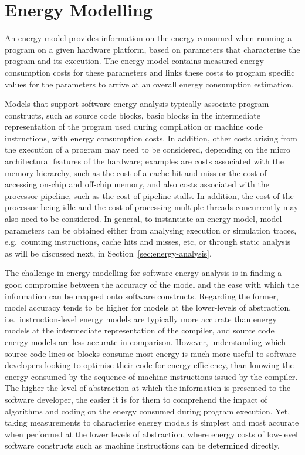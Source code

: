 \nopagebreak
\section{Energy Modelling}\label{sec:energy-models}

An energy model provides information on the energy consumed when running a program on a given hardware platform, based on parameters that characterise the program and its execution. The energy model contains measured energy consumption costs for these parameters and links these costs to program specific values for the parameters to arrive at an overall energy consumption estimation. 

Models that support software energy analysis typically associate program constructs, such as source code blocks, basic blocks in the intermediate representation of the program used during compilation or machine code instructions, with energy consumption costs. In addition, other costs arising from the execution of a program may need to be considered, depending on the micro architectural features of the hardware; examples are costs associated with the memory hierarchy, such as the cost of a cache hit and miss or the cost of accessing on-chip and off-chip memory, and also costs associated with the processor pipeline, such as the cost of pipeline stalls. In addition, the cost of the processor being idle and the cost of processing multiple threads concurrently may also need to be considered. 
%
In general, to instantiate an energy model, model parameters can be obtained either from analysing execution or simulation traces, e.g.\ counting instructions, cache hits and misses, etc, or through static analysis as will be discussed next, in Section~\ref{sec:energy-analysis}.

The challenge in energy modelling for software energy analysis is in finding a good compromise between the accuracy of the model and the ease with which the information can be mapped onto software constructs. Regarding the former, model accuracy tends to be higher for models at the lower-levels of abstraction, i.e.\ instruction-level energy models are typically more accurate than energy models at the intermediate representation of the compiler, and source code energy models are less accurate in comparison. 
%
However, understanding which source code lines or blocks consume most energy is much more useful to software developers looking to optimise their code for energy efficiency, than knowing the energy consumed by the sequence of machine instructions issued by the compiler. The higher the level of abstraction at which the information is presented to the software developer, the easier it is for them to comprehend the impact of algorithms and coding on the energy consumed during program execution. Yet, taking measurements to characterise energy models is simplest and most accurate when performed at the lower levels of abstraction, where energy costs of low-level software constructs such as machine instructions can be determined directly.



